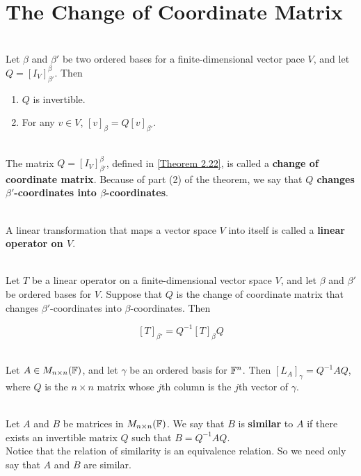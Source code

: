 \section{The Change of Coordinate Matrix}

\begin{theorem}\label{Theorem 2.22}
	\hfill\\
	Let $\beta$ and $\beta'$ be two ordered bases for a finite-dimensional vector pace $V$, and let $Q = [I_V]_{\beta'}^\beta$. Then

	\begin{enumerate}
		\item $Q$ is invertible.
		\item For any $v \in V$, $[v]_\beta = Q[v]_{\beta'}$.
	\end{enumerate}
\end{theorem}

\begin{definition}
	\hfill\\
	The matrix $Q=[I_V]_{\beta'}^\beta$, defined in \autoref{Theorem 2.22}, is called a \textbf{change of coordinate matrix}. Because of part (2) of the theorem, we say that \textbf{$Q$ changes $\beta'$-coordinates into $\beta$-coordinates}.
\end{definition}

\begin{definition}
	\hfill\\
	A linear transformation that maps a vector space $V$ into itself is called a \textbf{linear operator on $V$}.
\end{definition}

\begin{theorem}
	\hfill\\
	Let $T$ be a linear operator on a finite-dimensional vector space $V$, and let $\beta$ and $\beta'$ be ordered bases for $V$. Suppose that $Q$ is the change of coordinate matrix that changes $\beta'$-coordinates into $\beta$-coordinates. Then

	\[[T]_{\beta'}=Q^{-1}[T]_\beta Q\]
\end{theorem}

\begin{corollary}\label{Corollary 2.8}
	\hfill\\
	Let $A \in M_{n \times n}(\mathbb{F})$, and let $\gamma$ be an ordered basis for $\mathbb{F}^n$. Then $[L_A]_\gamma = Q^{-1}AQ$, where $Q$ is the $n \times n$ matrix whose $j$th column is the $j$th vector of $\gamma$.
\end{corollary}

\begin{definition}
	\hfill\\
	Let $A$ and $B$ be matrices in $M_{n \times n}(\mathbb{F})$. We say that $B$ is \textbf{similar} to $A$ if there exists an invertible matrix $Q$ such that $B = Q^{-1}AQ$.\\

	Notice that the relation of similarity is an equivalence relation. So we need only say that $A$ and $B$ are similar.
\end{definition}
